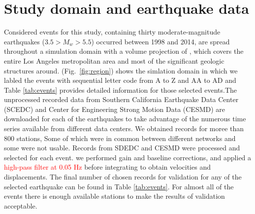 
\section{Study domain and earthquake data}

Considered events for this study, containing thirty moderate-magnitude earthquakes ($3.5 > M_w > 5.5$) occurred between 1998 and 2014, are spread throughout a simulation domain with a volume projection of , which covers the entire Los Angeles metropolitan area and most of the significant geologic structures around. (Fig.~\ref{fig:region}) shows the simlation domain in which we labled the events with sequential letter code from A to Z and AA to AD and Table \ref{tab:events} provides detailed information for those selected events.The unprocessed recorded data from Southern California Earthquake Data Center (SCEDC) and Center for Engineering Strong Motion Data (CESMD) are downloaded for each of the earthquakes to take advantage of the numerous time series available from different data centers. We obtained records for moree than 800 stations, Some of which were in common between different networks and some were not usable. Records from SDEDC and CESMD were processed and selected for each event. we performed gain and baseline corrections, and applied a \textcolor{red}{high-pass filter at 0.05 Hz} before integrating to obtain velocities and displacements. The final number of chosen records for validation for any of the selected earthquake can be found in Table \ref{tab:events}. For almost all of the events there is enough available stations to make the results of validation acceptable. 




